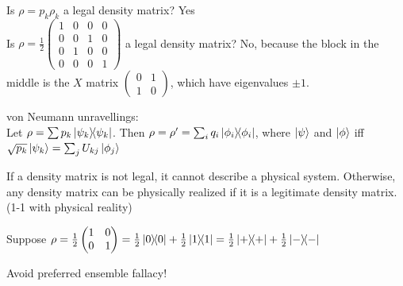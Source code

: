 \begin{example}
    Is $\rho = p_k \rho_k$ a legal density matrix? Yes\\
    Is $\rho = \frac{1}{2}\begin{pmatrix}1 & 0 & 0 & 0 \\ 0 & 0 & 1 & 0 \\ 0 & 1 & 0 & 0 \\ 0 & 0 & 0 & 1 \end{pmatrix}$ a legal density matrix? No, because the block in the middle is the $X$ matrix $\begin{pmatrix}0 & 1 \\ 1 & 0 \end{pmatrix}$, which have eigenvalues $\pm 1$.  
\end{example}

\begin{lemma}
    von Neumann unravellings: \\
    Let $\rho = \sum p_k \ketbra{\psi_k}$. Then $\rho = \rho' = \sum_i q_i \ketbra{\phi_i}$, where $\ket{\psi}$  and $\ket{\phi}$ iff $\sqrt{p_k} \ket{\psi_k} =  \sum_j U_{kj} \ket{\phi_j}$
\end{lemma}
If a density matrix is not legal, it cannot describe a physical system. Otherwise, any density matrix can be physically realized if it is a legitimate density matrix. (1-1 with physical reality) 

\begin{example}
    Suppose $\rho = \frac{1}{2} \begin{pmatrix}1 & 0 \\ 0 & 1\end{pmatrix} = \frac{1}{2} \ketbra{0} + \frac{1}{2} \ketbra{1} = \frac{1}{2} \ketbra{+} + \frac{1}{2} \ketbra{-}$     
\end{example}
Avoid preferred ensemble fallacy!